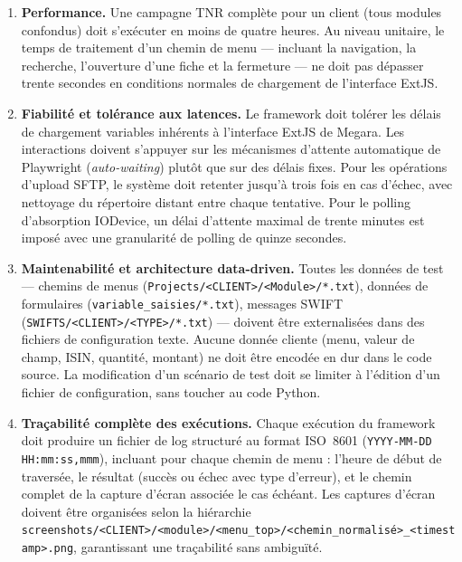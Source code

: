 \documentclass[12pt, a4paper]{report}
\begin{document}
\begin{enumerate}[label=\textbf{BNF\arabic*.}, leftmargin=*, itemsep=6pt]

  \item \textbf{Performance.}
  Une campagne TNR complète pour un client (tous modules confondus) doit s'exécuter en moins de quatre heures. Au niveau unitaire, le temps de traitement d'un chemin de menu — incluant la navigation, la recherche, l'ouverture d'une fiche et la fermeture — ne doit pas dépasser trente secondes en conditions normales de chargement de l'interface ExtJS.

  \item \textbf{Fiabilité et tolérance aux latences.}
  Le framework doit tolérer les délais de chargement variables inhérents à l'interface ExtJS de Megara. Les interactions doivent s'appuyer sur les mécanismes d'attente automatique de Playwright (\textit{auto-waiting}) plutôt que sur des délais fixes. Pour les opérations d'upload SFTP, le système doit retenter jusqu'à trois fois en cas d'échec, avec nettoyage du répertoire distant entre chaque tentative. Pour le polling d'absorption IODevice, un délai d'attente maximal de trente minutes est imposé avec une granularité de polling de quinze secondes.

  \item \textbf{Maintenabilité et architecture data-driven.}
  Toutes les données de test — chemins de menus (\texttt{Projects/<CLIENT>/<Module>/*.txt}), données de formulaires (\texttt{variable\_saisies/*.txt}), messages SWIFT (\texttt{SWIFTS/<CLIENT>/<TYPE>/*.txt}) — doivent être externalisées dans des fichiers de configuration texte. Aucune donnée cliente (menu, valeur de champ, ISIN, quantité, montant) ne doit être encodée en dur dans le code source. La modification d'un scénario de test doit se limiter à l'édition d'un fichier de configuration, sans toucher au code Python.

  \item \textbf{Traçabilité complète des exécutions.}
  Chaque exécution du framework doit produire un fichier de log structuré au format ISO~8601 (\texttt{YYYY-MM-DD HH:mm:ss,mmm}), incluant pour chaque chemin de menu : l'heure de début de traversée, le résultat (succès ou échec avec type d'erreur), et le chemin complet de la capture d'écran associée le cas échéant. Les captures d'écran doivent être organisées selon la hiérarchie \nolinkurl{screenshots/<CLIENT>/<module>/<menu_top>/<chemin_normalisé>_<timestamp>.png}, garantissant une traçabilité sans ambiguïté.


\end{enumerate}
\end{document}
